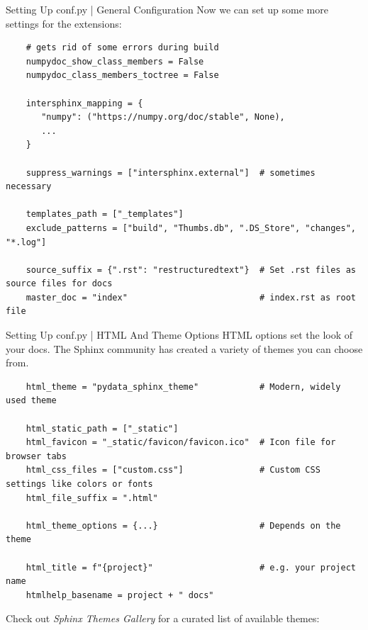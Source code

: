 \begin{darkframe}[fragile]{Setting Up conf.py | General Configuration}
  Now we can set up some more settings for the extensions:\\[0.25\baselineskip]
    \begin{verbatim}
    # gets rid of some errors during build
    numpydoc_show_class_members = False
    numpydoc_class_members_toctree = False

    intersphinx_mapping = {
       "numpy": ("https://numpy.org/doc/stable", None),
       ...
    }

    suppress_warnings = ["intersphinx.external"]  # sometimes necessary

    templates_path = ["_templates"]
    exclude_patterns = ["build", "Thumbs.db", ".DS_Store", "changes", "*.log"]

    source_suffix = {".rst": "restructuredtext"}  # Set .rst files as source files for docs
    master_doc = "index"                          # index.rst as root file
  \end{verbatim}
\end{darkframe}

\begin{darkframe}[fragile]{Setting Up conf.py | HTML And Theme Options}
  HTML options set the look of your docs. The Sphinx community has created a variety of
  themes you can choose from.\\[0.25\baselineskip]
  \begin{verbatim}
    html_theme = "pydata_sphinx_theme"            # Modern, widely used theme

    html_static_path = ["_static"]
    html_favicon = "_static/favicon/favicon.ico"  # Icon file for browser tabs
    html_css_files = ["custom.css"]               # Custom CSS settings like colors or fonts
    html_file_suffix = ".html"

    html_theme_options = {...}                    # Depends on the theme

    html_title = f"{project}"                     # e.g. your project name
    htmlhelp_basename = project + " docs"
  \end{verbatim}
  \vspace{0.25\baselineskip}
  Check out \emph{Sphinx Themes Gallery} for a curated list of available themes:
\end{darkframe}
